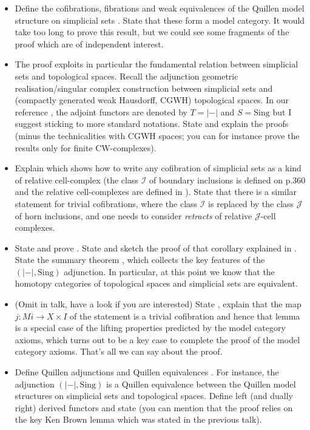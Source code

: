 \documentclass{amsart}
\theoremstyle{definition}
\theoremstyle{remark}
\newcommand{\ra}{\rightarrow}
\newcommand{\Sing}{\mathrm{Sing}}
\begin{document}
\begin{itemize}
\item Define the cofibrations, fibrations and weak equivalences of the Quillen model structure on simplicial sets \cite[Def. 17.5.1]{May_Ponto}. State that these form a model category. It would take too long to prove this result, but we could see some fragments of the proof which are of independent interest. 
\item The proof exploits in particular the fundamental relation between simplicial sets and topological spaces. Recall the adjunction geometric realisation/singular complex construction between simplicial sets and (compactly generated weak Hausdorff, CGWH) topological spaces. In our reference \cite[\S 17.5]{May_Ponto}, the adjoint functors are denoted by $T=|-|$ and $S=\Sing$ but I suggest sticking to more standard notations. State \cite[Lemmas 17.5.5-6]{May_Ponto} and explain the proofs (minus the technicalities with CGWH spaces; you can for instance prove the results only for finite CW-complexes).
\item Explain \cite[Lemma 17.6.1]{May_Ponto} which shows how to write any cofibration of simplicial sets as a kind of relative cell-complex (the class $\mathcal{I}$ of boundary inclusions is defined on p.360 and the relative cell-complexes are defined in \cite[Def. 15.1.1]{May_Ponto}). State that there is a similar statement for trivial cofibrations, where the class $\mathcal{I}$ is replaced by the class $\mathcal{J}$ of horn inclusions, and one needs to consider \emph{retracts} of relative $\mathcal{J}$-cell complexes.
\item State and prove \cite[Lemma 17.5.9]{May_Ponto}. State \cite[Thm. 17.5.10,Cor.17.5.11]{May_Ponto} and sketch the proof of that corollary explained in \cite[\S 16.2-3]{May_concise}. State the summary theorem \cite[Thm. 17.5.18]{May_Ponto}, which collects the key features of the $(|-|,\Sing)$ adjunction. In particular, at this point we know that the homotopy categories of topological spaces and simplicial sets are equivalent.
\item (Omit in talk, have a look if you are interested) State \cite[Lemma 17.6.2]{May_Ponto}, explain that the map $j:Mi\ra X\times I$ of the statement is a trivial cofibration and hence that lemma is a special case of the lifting properties predicted by the model category axioms, which turns out to be a key case to complete the proof of the model category axioms. That's all we can say about the proof.
\item Define Quillen adjunctions and Quillen equivalences \cite[Def. 16.2.1]{May_Ponto}. For instance, the adjunction $(|-|,\Sing)$ is a Quillen equivalence between the Quillen model structures on simplicial sets and topological spaces. Define left (and dually right) derived functors \cite[Def. 16.1.1]{May_Ponto} and state \cite[Prop. 16.2.2]{May_Ponto} (you can mention that the proof relies on the key Ken Brown lemma \cite[Lemma 14.2.9]{May_Ponto} which was stated in the previous talk).

\end{itemize}
\end{document}
